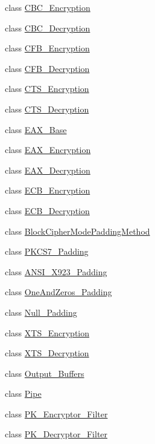 \begin{DoxyCompactItemize}
class \hyperlink{classBotan_1_1CBC__Encryption}{C\-B\-C\-\_\-\-Encryption}
\item 
class \hyperlink{classBotan_1_1CBC__Decryption}{C\-B\-C\-\_\-\-Decryption}
\item 
class \hyperlink{classBotan_1_1CFB__Encryption}{C\-F\-B\-\_\-\-Encryption}
\item 
class \hyperlink{classBotan_1_1CFB__Decryption}{C\-F\-B\-\_\-\-Decryption}
\item 
class \hyperlink{classBotan_1_1CTS__Encryption}{C\-T\-S\-\_\-\-Encryption}
\item 
class \hyperlink{classBotan_1_1CTS__Decryption}{C\-T\-S\-\_\-\-Decryption}
\item 
class \hyperlink{classBotan_1_1EAX__Base}{E\-A\-X\-\_\-\-Base}
\item 
class \hyperlink{classBotan_1_1EAX__Encryption}{E\-A\-X\-\_\-\-Encryption}
\item 
class \hyperlink{classBotan_1_1EAX__Decryption}{E\-A\-X\-\_\-\-Decryption}
\item 
class \hyperlink{classBotan_1_1ECB__Encryption}{E\-C\-B\-\_\-\-Encryption}
\item 
class \hyperlink{classBotan_1_1ECB__Decryption}{E\-C\-B\-\_\-\-Decryption}
\item 
class \hyperlink{classBotan_1_1BlockCipherModePaddingMethod}{Block\-Cipher\-Mode\-Padding\-Method}
\item 
class \hyperlink{classBotan_1_1PKCS7__Padding}{P\-K\-C\-S7\-\_\-\-Padding}
\item 
class \hyperlink{classBotan_1_1ANSI__X923__Padding}{A\-N\-S\-I\-\_\-\-X923\-\_\-\-Padding}
\item 
class \hyperlink{classBotan_1_1OneAndZeros__Padding}{One\-And\-Zeros\-\_\-\-Padding}
\item 
class \hyperlink{classBotan_1_1Null__Padding}{Null\-\_\-\-Padding}
\item 
class \hyperlink{classBotan_1_1XTS__Encryption}{X\-T\-S\-\_\-\-Encryption}
\item 
class \hyperlink{classBotan_1_1XTS__Decryption}{X\-T\-S\-\_\-\-Decryption}
\item 
class \hyperlink{classBotan_1_1Output__Buffers}{Output\-\_\-\-Buffers}
\item 
class \hyperlink{classBotan_1_1Pipe}{Pipe}
\item 
class \hyperlink{classBotan_1_1PK__Encryptor__Filter}{P\-K\-\_\-\-Encryptor\-\_\-\-Filter}
\item 
class \hyperlink{classBotan_1_1PK__Decryptor__Filter}{P\-K\-\_\-\-Decryptor\-\_\-\-Filter}

\end{DoxyCompactItemize}
